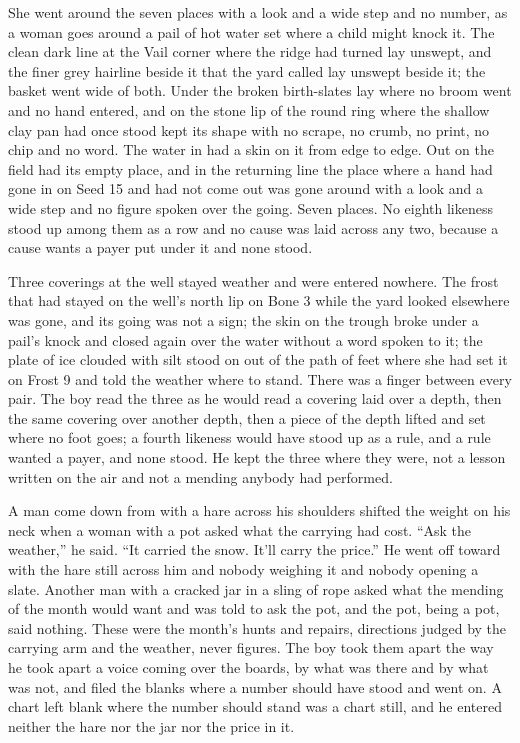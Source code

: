 She went around the seven places with a look and a wide step and no number, as a woman goes around a pail of hot water set where a child might knock it. The clean dark line at the Vail corner where the  ridge had turned lay unswept, and the finer grey hairline beside it that the yard called  lay unswept beside it; the basket went wide of both. Under  the broken birth-slates lay where no broom went and no hand entered, and on the stone lip of  the round ring where the shallow clay pan had once stood kept its shape with no scrape, no crumb, no print, no chip and no word. The water in  had a skin on it from edge to edge. Out on  the field had its empty place, and in the returning line the place where a hand had gone in on Seed 15 and had not come out was gone around with a look and a wide step and no figure spoken over the going. Seven places. No eighth likeness stood up among them as a row and no cause was laid across any two, because a cause wants a payer put under it and none stood.

Three coverings at the well stayed weather and were entered nowhere. The frost that had stayed on the well's north lip on Bone 3 while the yard looked elsewhere was gone, and its going was not a sign; the skin on the trough broke under a pail's knock and closed again over the water without a word spoken to it; the plate of ice clouded with silt stood on  out of the path of feet where she had set it on Frost 9 and told the weather where to stand. There was a finger between every pair. The boy read the three as he would read a covering laid over a depth, then the same covering over another depth, then a piece of the depth lifted and set where no foot goes; a fourth likeness would have stood up as a rule, and a rule wanted a payer, and none stood. He kept the three where they were, not a lesson written on the air and not a mending anybody had performed.

A man come down from  with a hare across his shoulders shifted the weight on his neck when a woman with a pot asked what the carrying had cost. “Ask the weather,” he said. “It carried the snow. It'll carry the price.” He went off toward  with the hare still across him and nobody weighing it and nobody opening a slate. Another man with a cracked jar in a sling of rope asked what the mending of the month would want and was told to ask the pot, and the pot, being a pot, said nothing. These were the month's hunts and repairs, directions judged by the carrying arm and the weather, never figures. The boy took them apart the way he took apart a voice coming over the boards, by what was there and by what was not, and filed the blanks where a number should have stood and went on. A chart left blank where the number should stand was a chart still, and he entered neither the hare nor the jar nor the price in it.

